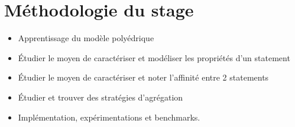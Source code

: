 \documentclass[5pt, compress]{beamer}
\makeatletter
\newcommand*{\currentname}{\@currentlabelname}
\makeatother
\begin{document}
\section{Méthodologie du stage}
    \begin{frame}{\currentname}
        \begin{itemize}\itemsep1em
            \item \alert<+>{Apprentissage du modèle polyédrique}
            \item \alert<+>{Étudier le moyen de caractériser et modéliser les propriétés d'un statement}
            \item \alert<+>{Étudier le moyen de caractériser et noter l'affinité entre 2 statements}
            \item \alert<+>{Étudier et trouver des stratégies d'agrégation}
            \item \alert<+>{Implémentation, expérimentations et benchmarks.}
        \end{itemize}
    \end{frame}
\end{document}
